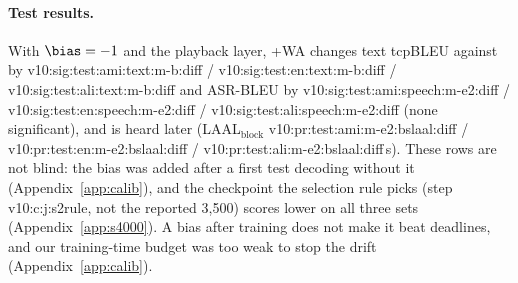 \paragraph{Test results.} With $\bias=-1$ and the playback layer, \sys{}+WA changes text tcpBLEU against \sys{} by
\num{v10:sig:test:ami:text:m-b:diff} / \num{v10:sig:test:en:text:m-b:diff} / \num{v10:sig:test:ali:text:m-b:diff} and ASR-BLEU by \num{v10:sig:test:ami:speech:m-e2:diff} /
\num{v10:sig:test:en:speech:m-e2:diff} / \num{v10:sig:test:ali:speech:m-e2:diff} (none significant), and is heard
later (LAAL$_\text{block}$ \num{v10:pr:test:ami:m-e2:bslaal:diff} / \num{v10:pr:test:en:m-e2:bslaal:diff} /
\num{v10:pr:test:ali:m-e2:bslaal:diff}\,s). These rows are not blind: the bias was added after a first test decoding
without it (Appendix~\ref{app:calib})\ifSfourK{}, and the checkpoint the selection rule picks (step \num{v10:c:j:s2rule}, not the
reported 3{,}500) scores lower on all three sets (Appendix~\ref{app:s4000})\fi. A bias after training does not make
it beat deadlines, and our training-time budget was too weak to stop the drift (Appendix~\ref{app:calib}).
